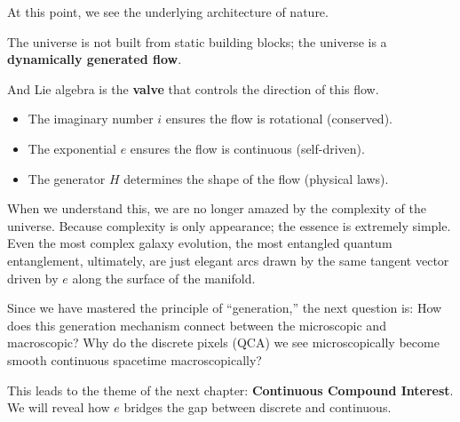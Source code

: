 At this point, we see the underlying architecture of nature.

The universe is not built from static building blocks; the universe is a \textbf{dynamically generated flow}.

And Lie algebra is the \textbf{valve} that controls the direction of this flow.

\begin{itemize}
\item The imaginary number $i$ ensures the flow is rotational (conserved).

\item The exponential $e$ ensures the flow is continuous (self-driven).

\item The generator $H$ determines the shape of the flow (physical laws).
\end{itemize}

When we understand this, we are no longer amazed by the complexity of the universe. Because complexity is only appearance; the essence is extremely simple. Even the most complex galaxy evolution, the most entangled quantum entanglement, ultimately, are just elegant arcs drawn by the same tangent vector driven by $e$ along the surface of the manifold.

Since we have mastered the principle of ``generation,'' the next question is: How does this generation mechanism connect between the microscopic and macroscopic? Why do the discrete pixels (QCA) we see microscopically become smooth continuous spacetime macroscopically?

This leads to the theme of the next chapter: \textbf{Continuous Compound Interest}. We will reveal how $e$ bridges the gap between discrete and continuous.

